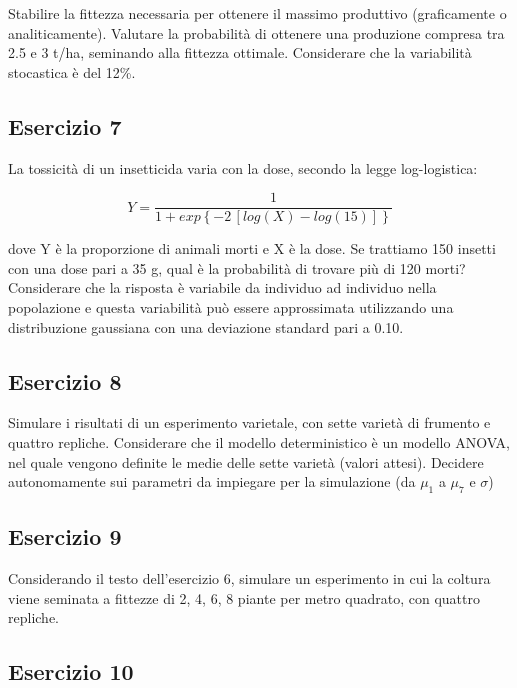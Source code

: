\documentclass[a4paper,12pt,oneside]{book}
\begin{document}
Stabilire la fittezza necessaria per ottenere il massimo produttivo (graficamente o analiticamente). Valutare la probabilità di ottenere una produzione compresa tra 2.5 e 3 t/ha, seminando alla fittezza ottimale. Considerare che la variabilità stocastica è del 12\%.

\hypertarget{esercizio-7}{%
\subsection{Esercizio 7}\label{esercizio-7}}

La tossicità di un insetticida varia con la dose, secondo la legge log-logistica:

\[ Y = \frac{1}{1 + exp\left\{ -2 \, \left[log(X) - log(15)\right] \right\}}\]

dove Y è la proporzione di animali morti e X è la dose. Se trattiamo 150 insetti con una dose pari a 35 g, qual è la probabilità di trovare più di 120 morti? Considerare che la risposta è variabile da individuo ad individuo nella popolazione e questa variabilità può essere approssimata utilizzando una distribuzione gaussiana con una deviazione standard pari a 0.10.

\hypertarget{esercizio-8}{%
\subsection{Esercizio 8}\label{esercizio-8}}

Simulare i risultati di un esperimento varietale, con sette varietà di frumento e quattro repliche. Considerare che il modello deterministico è un modello ANOVA, nel quale vengono definite le medie delle sette varietà (valori attesi). Decidere autonomamente sui parametri da impiegare per la simulazione (da \(\mu_1\) a \(\mu_7\) e \(\sigma\))

\hypertarget{esercizio-9}{%
\subsection{Esercizio 9}\label{esercizio-9}}

Considerando il testo dell'esercizio 6, simulare un esperimento in cui la coltura viene seminata a fittezze di 2, 4, 6, 8 piante per metro quadrato, con quattro repliche.

\hypertarget{esercizio-10}{%
\subsection{Esercizio 10}\label{esercizio-10}}
\end{document}
